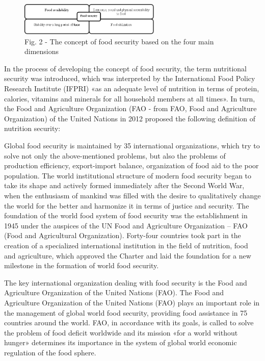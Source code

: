 \begin{figure}[H]
	\centering
	\includegraphics[width=0.6\textwidth]{media/ekon3/image2}
	\caption*{Fig. 2 - The concept of food security based on the four main dimensions}
\end{figure}

\begin{multicols}{2}
In the process of developing the concept of food security, the term
nutritional security was introduced, which was interpreted by the
International Food Policy Research Institute (IFPRI) «as an adequate
level of nutrition in terms of protein, calories, vitamins and minerals
for all household members at all times». In turn, the Food and
Agriculture Organization (FAO - from FAO, Food and Agriculture
Organization) of the United Nations in 2012 proposed the following
definition of nutrition security:

Global food security is maintained by 35 international organizations,
which try to solve not only the above-mentioned problems, but also the
problems of production efficiency, export-import balance, organization
of food aid to the poor population. The world institutional structure of
modern food security began to take its shape and actively formed
immediately after the Second World War, when the enthusiasm of mankind
was filled with the desire to qualitatively change the world for the
better and harmonize it in terms of justice and security. The foundation
of the world food system of food security was the establishment in 1945
under the auspices of the UN Food and Agriculture Organization -- FAO
(Food and Agricultural Organization). Forty-four countries took part in
the creation of a specialized international institution in the field of
nutrition, food and agriculture, which approved the Charter and laid the
foundation for a new milestone in the formation of world food security.

The key international organization dealing with food security is the
Food and Agriculture Organization of the United Nations (FAO). The Food
and Agriculture Organization of the United Nations (FAO) plays an
important role in the management of global world food security,
providing food assistance in 75 countries around the world. FAO, in
accordance with its goals, is called to solve the problem of food
deficit worldwide and its mission «for a world without hunger»
determines its importance in the system of global world economic
regulation of the food sphere.


\end{multicols}
